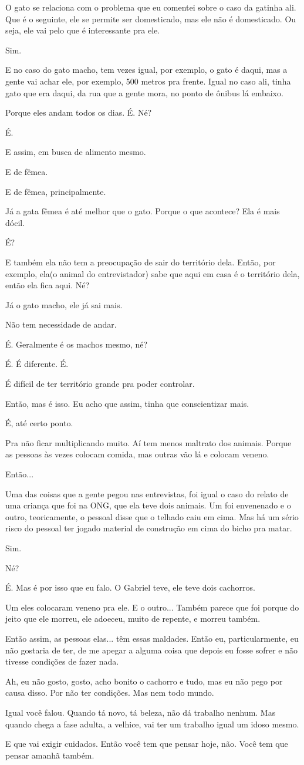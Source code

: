 \documentclass[12pt,a4paper]{article}
\newenvironment{turnos}{\begin{list}{}{\setlength{\leftmargin}{2.2cm}\setlength{\labelwidth}{2.0cm}\setlength{\labelsep}{0.2cm}\setlength{\itemsep}{0.45em}\setlength{\parsep}{0pt}}}{\end{list}}
\newcommand{\fala}[1]{\item[\textbf{#1}\hfill]}
\begin{document}
\begin{turnos}
\fala{E:} O gato se relaciona com o problema que eu comentei sobre o caso da gatinha ali. Que é o seguinte, ele se permite ser domesticado, mas ele não é domesticado. Ou seja, ele vai pelo que é interessante pra ele.
\fala{G:} Sim. 
\fala{E:} E no caso do gato macho, tem vezes igual, por exemplo, o gato é daqui, mas a gente vai achar ele, por exemplo, 500 metros pra frente. Igual no caso ali, tinha gato que era daqui, da rua que a gente mora, no ponto de ônibus lá embaixo.
\fala{E:} Porque eles andam todos os dias. É. Né?
\fala{A:} É.
\fala{E:} E assim, em busca de alimento mesmo. 
\fala{A:} E de fêmea. 
\fala{E:} E de fêmea, principalmente.
\fala{E:} Já a gata fêmea é até melhor que o gato. Porque o que acontece? Ela é mais dócil.
\fala{G:} É?
\fala{E:} E também ela não tem a preocupação de sair do território dela. Então, por exemplo, ela(o animal do entrevistador) sabe que aqui em casa é o território dela, então ela fica aqui. Né?
\fala{E:} Já o gato macho, ele já sai mais.
\fala{A:} Não tem necessidade de andar. 
\fala{G:} É. Geralmente é os machos mesmo, né?
\fala{A:} É. É diferente. É.
\fala{A:} É difícil de ter território grande pra poder controlar. 
\fala{G:} Então, mas é isso. Eu acho que assim, tinha que conscientizar mais.
\fala{E:} É, até certo ponto.
\fala{G:} Pra não ficar multiplicando muito. Aí tem menos maltrato dos animais. Porque as pessoas às vezes colocam comida, mas outras vão lá e colocam veneno.
\fala{A:} Então...
\fala{E:} Uma das coisas que a gente pegou nas entrevistas, foi igual o caso do relato de uma criança que foi na ONG, que ela teve dois animais. Um foi envenenado e o outro, teoricamente, o pessoal disse que o telhado caiu em cima. Mas há um sério risco do pessoal ter jogado material de construção em cima do bicho pra matar.
\fala{G:} Sim.
\fala{E:} Né?
\fala{G:} É. Mas é por isso que eu falo. O Gabriel teve, ele teve dois cachorros.
\fala{G:} Um eles colocaram veneno pra ele. E o outro... Também parece que foi porque do jeito que ele morreu, ele adoeceu, muito de repente, e morreu também.
\fala{G:} Então assim, as pessoas elas... têm essas maldades. Então eu, particularmente, eu não gostaria de ter, de me apegar a alguma coisa que depois eu fosse sofrer e não tivesse condições de fazer nada.
\fala{G:} Ah, eu não gosto, gosto, acho bonito o cachorro e tudo, mas eu não pego por causa disso. Por não ter condições. Mas nem todo mundo.
\fala{G:} Igual você falou. Quando tá novo, tá beleza, não dá trabalho nenhum. Mas quando chega a fase adulta, a velhice, vai ter um trabalho igual um idoso mesmo.
\fala{G:} E que vai exigir cuidados. Então você tem que pensar hoje, não. Você tem que pensar amanhã também.

\end{turnos}
\end{document}
